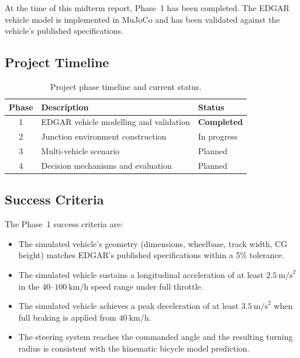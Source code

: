 \documentclass[a4paper,12pt]{report}
\begin{document}
At the time of this midterm report, Phase~1 has been completed. The EDGAR
vehicle model is implemented in MuJoCo and has been validated against the
vehicle's published specifications.

\subsection{Project Timeline}

\begin{table}[h]
\centering
\caption{Project phase timeline and current status.}
\begin{tabular}{|c|l|l|}
\hline
\textbf{Phase} & \textbf{Description} & \textbf{Status} \\ \hline
1 & EDGAR vehicle modelling and validation    & \textbf{Completed} \\ \hline
2 & Junction environment construction         & In progress        \\ \hline
3 & Multi-vehicle scenario                    & Planned            \\ \hline
4 & Decision mechanisms and evaluation        & Planned            \\ \hline
\end{tabular}
\label{table:timeline}
\end{table}

\subsection{Success Criteria}

The Phase~1 success criteria are:
\begin{itemize}
  \item The simulated vehicle's geometry (dimensions, wheelbase, track width,
        CG height) matches EDGAR's published specifications within a 5\%
        tolerance.
  \item The simulated vehicle sustains a longitudinal acceleration of at least
        $2.5\ \text{m/s}^2$ in the $40$–$100\ \text{km/h}$ speed range under
        full throttle.
  \item The simulated vehicle achieves a peak deceleration of at least
        $3.5\ \text{m/s}^2$ when full braking is applied from $40\ \text{km/h}$.
  \item The steering system reaches the commanded angle and the resulting turning
        radius is consistent with the kinematic bicycle model prediction.
\end{itemize}
\end{document}
